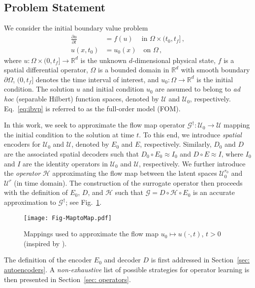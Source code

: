 \subsection{Problem Statement}
We consider the initial boundary value problem 
\begin{subequations}\label{eq:ibvp}
    \begin{align}
        \frac{\partial u}{\partial t} & = f(u) \quad~ \text{in } \Omega \times (t_0, t_f]\,,\\
        u(x, t_0) & = u_0(x) \quad \text{on } \Omega\,,
    \end{align}
\end{subequations}
where $u: \Omega \times (0, t_f] \to \mathbb{R}^{d}$ is the unknown $d$-dimensional physical state, $f$ is a spatial differential operator, $\Omega$ is a bounded domain in $\mathbb{R}^{d}$ with smooth boundary $\partial\Omega$, $(0, t_f]$ denotes the time interval of interest, and $u_0: \Omega \to \mathbb{R}^{d}$ is the initial condition. The solution $u$ and initial condition $u_0$ are assumed to belong to \textit{ad hoc} (separable Hilbert) function spaces, denoted by $\mathcal{U}$ and $\mathcal{U}_0$, respectively. Eq.~\eqref{eq:ibvp} is referred to as the full-order model (FOM). 

In this work, we seek to approximate the flow map operator $\mathcal{G}^\dagger: \mathcal{U}_0 \to \mathcal{U}$ mapping the initial condition to the solution at time $t$. To this end, we introduce \textit{spatial} encoders for $\mathcal{U}_0$ and $\mathcal{U}$, denoted by $E_0$ and $E$, respectively. Similarly, $D_0$ and $D$ are the associated spatial decoders such that $D_0 \circ E_0 \approx I_0$ and $D \circ E \approx I$, where $I_0$ and $I$ are the identity operators in $\mathcal{U}_0$ and $\mathcal{U}$, respectively. We further introduce the \textit{operator} $\mathcal{H}$ approximating the flow map between the latent spaces $\mathcal{U}_0^{r_0}$ and $\mathcal{U}^r$ (in time domain). The construction of the surrogate operator then proceeds with the definition of $E_0$, $D$, and $\mathcal{H}$ such that $\mathcal{G} = D \circ \mathcal{H} \circ E_0$ is an accurate approximation to $\mathcal{G}^\dagger$; see Fig.~\ref{fig:maptomap}.
\begin{figure}[!ht]
	\begin{center}
        \texttt{[image: Fig-MaptoMap.pdf]}
    \end{center}
    \caption[Flow map $u_0 \mapsto u(\cdot, t)$, $t > 0$.]{Mappings used to approximate the flow map $u_0 \mapsto u(\cdot, t)$, $t > 0$ (inspired by \cite{stuart2021}).}
    \label{fig:maptomap}
\end{figure}
The definition of the encoder $E_0$ and decoder $D$ is first addressed in Section~\ref{sec: autoencoders}. A \textit{non-exhaustive} list of possible strategies for operator learning is then presented in Section~\ref{sec: operators}. 

